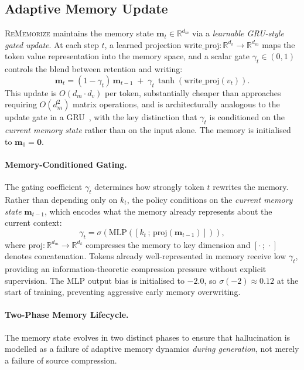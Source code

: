 \documentclass{article}
\begin{document}
\subsection{Adaptive Memory Update}
\textsc{ReMemorize} maintains the memory state $\mathbf{m}_t \in \mathbb{R}^{d_m}$ via a \emph{learnable GRU-style gated update}.
At each step $t$, a learned projection $\mathrm{write\_proj}: \mathbb{R}^{d_v} \to \mathbb{R}^{d_m}$ maps the token value representation into the memory space, and a scalar gate $\gamma_t \in (0,1)$ controls the blend between retention and writing:
\begin{equation}
\label{eq:mem_update}
\mathbf{m}_t = (1 - \gamma_t)\,\mathbf{m}_{t-1} \;+\; \gamma_t\,\tanh\!\left(\mathrm{write\_proj}(v_t)\right).
\end{equation}
This update is $O(d_m \cdot d_v)$ per token, substantially cheaper than approaches requiring $O(d_m^2)$ matrix operations, and is architecturally analogous to the update gate in a GRU~\citep{chung2014empirical}, with the key distinction that $\gamma_t$ is conditioned on the \emph{current memory state} rather than on the input alone.
The memory is initialised to $\mathbf{m}_0 = \mathbf{0}$.

\paragraph{Memory-Conditioned Gating.}
The gating coefficient $\gamma_t$ determines how strongly token $t$ rewrites the memory.
Rather than depending only on $k_t$, the policy conditions on the \emph{current memory state} $\mathbf{m}_{t-1}$, which encodes what the memory already represents about the current context:
\begin{equation}
\label{eq:gate}
\gamma_t = \sigma\!\left(
  \mathrm{MLP}\!\left([k_t\,;\,\mathrm{proj}(\mathbf{m}_{t-1})]\right)
\right),
\end{equation}
where $\mathrm{proj}: \mathbb{R}^{d_m} \to \mathbb{R}^{d_k}$ compresses the memory to key dimension and $[\cdot\,;\,\cdot]$ denotes concatenation.
Tokens already well-represented in memory receive low $\gamma_t$, providing an information-theoretic compression pressure without explicit supervision.
The MLP output bias is initialised to $-2.0$, so $\sigma(-2) \approx 0.12$ at the start of training, preventing aggressive early memory overwriting.

\paragraph{Two-Phase Memory Lifecycle.}
The memory state evolves in two distinct phases to ensure that hallucination is modelled as a failure of adaptive memory dynamics \emph{during generation}, not merely a failure of source compression.
\end{document}
